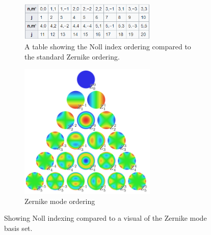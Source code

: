 \begin{figure}[H]
\centering
\begin{subfigure}{.5\textwidth}
  \centering
  \includegraphics[width=6.5cm]{Figures/noll_indexing.png}
  \caption{A table showing the Noll index ordering compared to the standard Zernike ordering\cite{Noll1976ZERNIKETURBULENCE.}.}
  \label{fig:noll_table}
\end{subfigure}%
\begin{subfigure}{.5\textwidth}
  \centering
  \includegraphics[width=6.5cm]{Figures/1024px-Zernike_polynomials2.png}
  \caption{Zernike mode ordering \cite{Noll1976ZERNIKETURBULENCE.}}
  \label{fig:Zernike}
\end{subfigure}
\caption{Showing Noll indexing compared to a visual of the Zernike mode basis set.}
\label{fig:zerns}
\end{figure}

